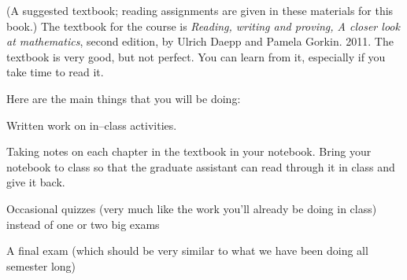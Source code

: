 
\vspace*{0.5in}

  (A suggested textbook; reading assignments are given in these materials for this book.)  
The textbook for the course is {\em Reading, writing and proving, A closer look at mathematics}, second edition, by Ulrich Daepp and Pamela Gorkin.  2011.  The textbook is very good, but not perfect.  You can learn from it, especially if you take time to read it.


\vspace*{1in}


\vspace*{0.5in}



\vspace*{0.5in}

 Here are the main things that you will be doing:
\blist{0.1in}
\item Written work on in--class activities.
\item Taking notes on each chapter in the textbook in your notebook.  Bring your notebook to class so that the graduate assistant can read through it in class and give it back.
\item Occasional quizzes (very much like the work you'll already be doing in class) instead of one or two big exams
\item A final exam (which should be very similar to what we have been doing all semester long)
\elist


\vspace*{1in}

